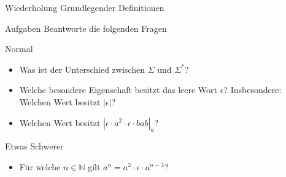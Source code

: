 
{
\begin{frame}[fragile]{Wiederholung Grundlegender Definitionen}
    \begin{alertblock}{Aufgaben}
    Beantworte die folgenden Fragen
    \end{alertblock}
    \begin{block}{Normal}
    \begin{itemize}
        \item Was ist der Unterschied zwischen $\Sigma$ und $\Sigma^*$?
        \item Welche besondere Eigenschaft besitzt das leere Wort $\epsilon$? Insbesondere: Welchen Wert besitzt $|\epsilon|$?
        \item Welchen Wert besitzt $|\epsilon \cdot a^2 \cdot \epsilon \cdot bab|_a$?
    \end{itemize}
    \end{block}
    \begin{block}{Etwas Schwerer}
    \begin{itemize}
        \item Für welche $n \in \mathbb{N}$ gilt $a^n = a^3 \cdot \epsilon \cdot a^{n-3}$?
    \end{itemize}
    \end{block}
\end{frame}
}

